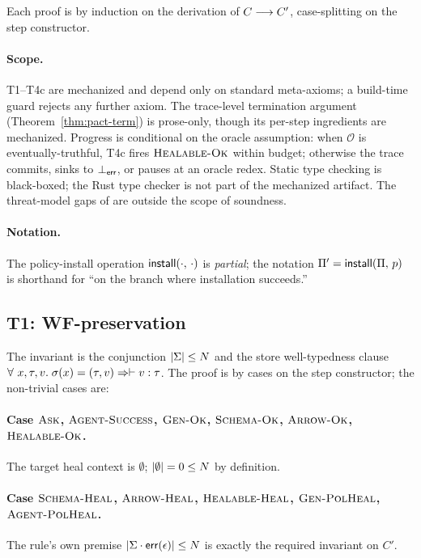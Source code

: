 Each proof is by induction on the derivation of $C \longrightarrow C'$, case-splitting on
the step constructor.

\paragraph{Scope.} T1--T4c are mechanized and depend only on standard
meta-axioms; a build-time guard rejects any further axiom. The trace-level
termination argument (Theorem~\ref{thm:pact-term}) is prose-only, though its
per-step ingredients are mechanized. Progress is conditional on the oracle
assumption: when $\mathcal{O}$ is eventually-truthful, T4c fires
$\textsc{Healable-Ok}$ within budget; otherwise the trace commits, sinks to
$\bot_{\mathsf{err}}$, or pauses at an oracle redex. Static type checking is black-boxed; the
Rust type checker is not part of the mechanized artifact. The threat-model gaps
of  are outside the scope of soundness.

\paragraph{Notation.} The policy-install operation $\mathsf{install}(\cdot,\,\cdot)$ is
\emph{partial}; the notation $\Pi' = \mathsf{install}(\Pi,\,p)$ is shorthand for
``on the branch where installation succeeds.''

\subsection{T1: WF-preservation}
\label{app:proof-sound-a}

The invariant is the conjunction $|\Sigma| \le N$ and the store well-typedness clause $\forall~x,\tau,v.\;\sigma(x) = (\tau,v) \Rightarrow \vdash v : \tau$. The proof is by cases on the step constructor; the non-trivial cases are:

\begin{sloppypar}
\paragraph{Case $\textsc{Ask}$, $\textsc{Agent-Success}$,
$\textsc{Gen-Ok}$, $\textsc{Schema-Ok}$, $\textsc{Arrow-Ok}$,
$\textsc{Healable-Ok}$.} The target heal context is $\emptyset$; $|\emptyset|
= 0 \le N$ by definition.
\end{sloppypar}

\begin{sloppypar}
\paragraph{Case $\textsc{Schema-Heal}$, $\textsc{Arrow-Heal}$,
$\textsc{Healable-Heal}$, $\textsc{Gen-PolHeal}$,
$\textsc{Agent-PolHeal}$.} The rule's own premise $|\Sigma \cdot
\mathsf{err}(\epsilon)| \le N$ is exactly the required invariant on $C'$.
\end{sloppypar}

